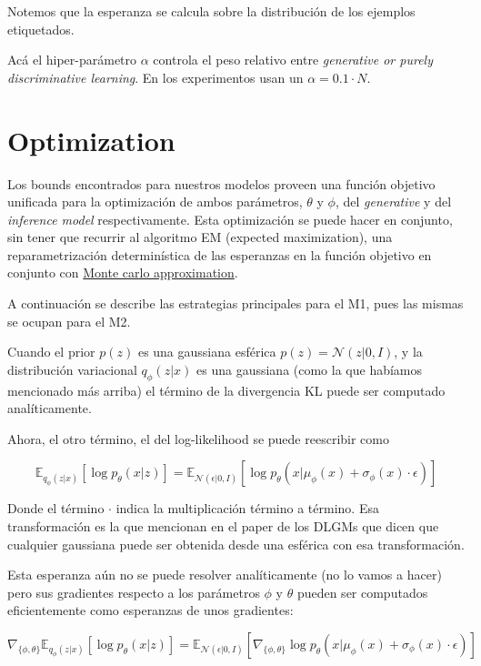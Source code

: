\documentclass[letterpaper,11pt]{article} %
\begin{document}
	Notemos que la esperanza se calcula sobre la distribución de los ejemplos etiquetados.
	
	Acá el hiper-parámetro $\alpha$ controla el peso relativo entre \textit{generative or purely discriminative learning}. En los experimentos usan un $\alpha = 0.1 \cdot N$. 
	
\section{Optimization}

	Los bounds encontrados para nuestros modelos proveen una función objetivo unificada para la optimización de ambos parámetros, $\theta$ y $\phi$, del \textit{generative} y del \textit{inference model} respectivamente. Esta optimización se puede hacer en conjunto, sin tener que recurrir al algoritmo EM (expected maximization), una reparametrización determinística de las esperanzas en la función objetivo en conjunto con \href{https://en.wikipedia.org/wiki/Monte_Carlo_method}{Monte carlo approximation}.  
	
	A continuación se describe las estrategias principales para el M1, pues las mismas se ocupan para el M2.
	
	Cuando el prior $p(z)$ es una gaussiana esférica $p(z) = \mathcal{N}(z|0,I)$, y la distribución variacional $q_{\phi}(z|x)$ es una gaussiana (como la que habíamos mencionado más arriba) el término de la divergencia KL puede ser computado analíticamente.
	
	Ahora, el otro término, el del log-likelihood se puede reescribir como
	
	$$ \mathbb{E}_{q_{\phi}(z|x)}[\log p_{\theta}(x|z)] =
	\mathbb{E}_{\mathcal{N}(\epsilon|0,I)}[\log p_{\theta}(x| \mu_{\phi}(x) + \sigma_{\phi}(x) \cdot \epsilon)] $$
	
	Donde el término $\cdot$ indica la multiplicación término a término. Esa transformación es la que mencionan en el paper de los DLGMs que dicen que cualquier gaussiana puede ser obtenida desde una esférica con esa transformación.
	
	Esta esperanza aún no se puede resolver analíticamente (no lo vamos a hacer) pero sus gradientes respecto a los parámetros $\phi$ y $\theta$ pueden ser computados eficientemente como esperanzas de unos gradientes:
	
	$$ \nabla_{\{\phi, \theta\}} \mathbb{E}_{q_{\phi}(z|x)}[\log p_{\theta}(x|z)] =
	\mathbb{E}_{\mathcal{N}(\epsilon|0,I)}[\nabla_{\{\phi,\theta\}} \log p_{\theta}(x| \mu_{\phi}(x) + \sigma_{\phi}(x)\cdot \epsilon)] $$
	
\end{document}
